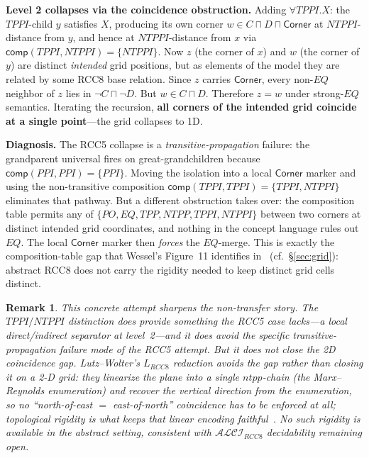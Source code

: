 \documentclass[11pt]{article}
\newtheorem{remark}[theorem]{Remark}
\newcommand{\ALCIRCC}[1]{\ensuremath{\mathcal{ALCI}_{\mathit{RCC#1}}}}
\newcommand{\LRCC}[1]{\ensuremath{L_{\mathit{RCC#1}}}}
\newcommand{\comp}{\mathsf{comp}}
\begin{document}
\medskip\noindent\textbf{Level 2 collapses via the coincidence
obstruction.}  Adding $\forall TPPI.X$: the $TPPI$-child $y$ satisfies
$X$, producing its own corner $w \in C \sqcap D \sqcap \mathsf{Corner}$
at $NTPPI$-distance from $y$, and hence at $NTPPI$-distance from $x$
via $\comp(TPPI,NTPPI) = \{NTPPI\}$.  Now $z$ (the corner of $x$)
and $w$ (the corner of $y$) are distinct \emph{intended} grid
positions, but as elements of the model they are related by some RCC8
base relation.  Since $z$ carries $\mathsf{Corner}$, every non-$EQ$
neighbor of $z$ lies in $\neg C \sqcap \neg D$.  But $w \in C \sqcap D$.
Therefore $z = w$ under strong-$EQ$ semantics.  Iterating the
recursion, \textbf{all corners of the intended grid coincide at a
single point}---the grid collapses to 1D.

\medskip\noindent\textbf{Diagnosis.}  The RCC5 collapse is a
\emph{transitive-propagation} failure: the grandparent universal fires
on great-grandchildren because $\comp(PPI,PPI) = \{PPI\}$.  Moving
the isolation into a local $\mathsf{Corner}$ marker and using the
non-transitive composition $\comp(TPPI,TPPI) = \{TPPI,NTPPI\}$
eliminates that pathway.  But a different obstruction takes over: the
composition table permits any of
$\{PO, EQ, TPP, NTPP, TPPI, NTPPI\}$ between two corners at
distinct intended grid coordinates, and nothing in the concept
language rules out $EQ$.  The local $\mathsf{Corner}$ marker then
\emph{forces} the $EQ$-merge.  This is exactly the composition-table
gap that Wessel's Figure~11 identifies in~\cite{Wessel2003}
(cf.~\S\ref{sec:grid}): abstract RCC8 does not carry the rigidity
needed to keep distinct grid cells distinct.

\begin{remark}\label{rem:concrete-attempt-conclusion}
  This concrete attempt sharpens the non-transfer story.  The
  $TPPI/NTPPI$ distinction does provide something the RCC5 case
  lacks---a local direct/indirect separator at level~2---and it does
  avoid the specific transitive-propagation failure mode of the RCC5
  attempt.  But it does \emph{not} close the 2D coincidence gap.
  Lutz--Wolter's $\LRCC{8}$ reduction \emph{avoids} the gap rather than
  closing it on a 2-D grid: they linearize the plane into a single
  $ntpp$-chain (the Marx--Reynolds enumeration) and recover the vertical
  direction from the enumeration, so no ``north-of-east $=$ east-of-north''
  coincidence has to be enforced at all; topological rigidity is what keeps
  that linear encoding faithful~\cite{LutzWolter2006}.
  No such rigidity is available in the abstract setting, consistent
  with $\ALCIRCC{8}$ decidability remaining open.
\end{remark}
\end{document}
